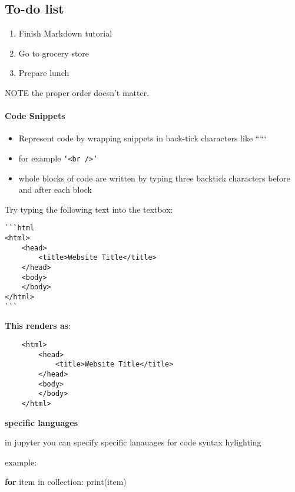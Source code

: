 \documentclass{article}
\providecommand{\tightlist}{%
      \setlength{\itemsep}{0pt}\setlength{\parskip}{0pt}}
\newenvironment{Shaded}{}{}
\newcommand{\NormalTok}[1]{{#1}}
\newcommand{\ControlFlowTok}[1]{\textcolor[rgb]{0.00,0.44,0.13}{\textbf{{#1}}}}
\newcommand{\OperatorTok}[1]{\textcolor[rgb]{0.40,0.40,0.40}{{#1}}}
\newcommand{\BuiltInTok}[1]{{#1}}
\begin{document}
\subsection{To-do list}\label{to-do-list}

\begin{enumerate}
\def\labelenumi{\arabic{enumi}.}
\tightlist
\item
  Finish Markdown tutorial
\item
  Go to grocery store
\item
  Prepare lunch
\end{enumerate}

NOTE the proper order doesn't matter.

    \paragraph{Code Snippets}\label{code-snippets}

    \begin{itemize}
\tightlist
\item
  Represent code by wrapping snippets in back-tick characters like `````
\item
  for example \texttt{`\textless{}br\ /\textgreater{}`}
\item
  whole blocks of code are written by typing three backtick characters
  before and after each block
\end{itemize}

Try typing the following text into the textbox:

\begin{verbatim}
```html
<html>
    <head>
        <title>Website Title</title>
    </head>
    <body>
    </body>
</html>
```
\end{verbatim}

    \textbf{This renders as}:

\begin{verbatim}
    <html>
        <head>
            <title>Website Title</title>
        </head>
        <body>
        </body>
    </html>
\end{verbatim}

    \textbf{specific languages}

in jupyter you can specify specific lanauages for code syntax hylighting

example:

\begin{Shaded}
\begin{Highlighting}[]

\ControlFlowTok{for} \NormalTok{item }\OperatorTok{in} \NormalTok{collection:}
    \BuiltInTok{print}\NormalTok{(item)}
\end{Highlighting}
\end{Shaded}
\end{document}
